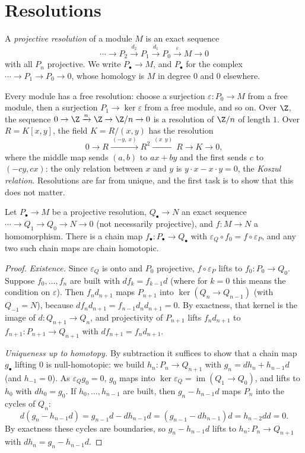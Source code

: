\section{Resolutions}

\begin{definition}\label{def:resolution}
A \emph{projective resolution} of a module $M$ is an exact sequence
\[
\cdots\to P_2\xrightarrow{d_2}P_1\xrightarrow{d_1}P_0\xrightarrow{\varepsilon}M\to0
\]
with all $P_n$ projective. We write $P_\bullet\to M$, and $P_\bullet$ for the complex $\cdots\to P_1\to P_0\to0$, whose homology is $M$ in degree $0$ and $0$ elsewhere.
\end{definition}

Every module has a free resolution: choose a surjection $\varepsilon\colon P_0\to M$ from a free module, then a surjection $P_1\to\ker\varepsilon$ from a free module, and so on. Over $\Z$, the sequence
$0\to\Z\xrightarrow{n}\Z\to\Z/n\to0$ is a resolution of $\Z/n$ of length $1$. Over $R=K[x,y]$, the field $K=R/(x,y)$ has the resolution
\[
0\to R\xrightarrow{\ (-y,\ x)\ }R^2\xrightarrow{\ (x\ \ y)\ }R\to K\to0,
\]
where the middle map sends $(a,b)$ to $ax+by$ and the first sends $c$ to $(-cy,cx)$: the only relation between $x$ and $y$ is $y\cdot x-x\cdot y=0$, the \emph{Koszul relation}. Resolutions are far from unique, and the first task is to
show that this does not matter.

\begin{theorem}\label{thm:comparison}
Let $P_\bullet\to M$ be a projective resolution, $Q_\bullet\to N$ an exact sequence $\cdots\to Q_1\to Q_0\to N\to0$ (not necessarily projective), and $f\colon M\to N$ a homomorphism. There is a chain map $f_\bullet\colon P_\bullet\to Q_\bullet$
with $\varepsilon_Q\circ f_0=f\circ\varepsilon_P$, and any two such chain maps are chain homotopic.
\end{theorem}

\begin{proof}
\emph{Existence.} Since $\varepsilon_Q$ is onto and $P_0$ projective, $f\circ\varepsilon_P$ lifts to $f_0\colon P_0\to Q_0$. Suppose $f_0,\dots,f_n$ are built with $d f_k=f_{k-1}d$ (where for $k=0$ this means the condition on
$\varepsilon$). Then $f_nd_{n+1}$ maps $P_{n+1}$ into $\ker(Q_n\to Q_{n-1})$ (with $Q_{-1}=N$), because $d f_nd_{n+1}=f_{n-1}d_nd_{n+1}=0$. By exactness, that kernel is the image of $d\colon Q_{n+1}\to Q_n$, and projectivity of
$P_{n+1}$ lifts $f_nd_{n+1}$ to $f_{n+1}\colon P_{n+1}\to Q_{n+1}$ with $df_{n+1}=f_nd_{n+1}$.

\emph{Uniqueness up to homotopy.} By subtraction it suffices to show that a chain map $g_\bullet$ lifting $0$ is null-homotopic: we build $h_n\colon P_n\to Q_{n+1}$ with $g_n=dh_n+h_{n-1}d$ (and $h_{-1}=0$). As $\varepsilon_Qg_0=0$,
$g_0$ maps into $\ker\varepsilon_Q=\operatorname{im}(Q_1\to Q_0)$, and lifts to $h_0$ with $dh_0=g_0$. If $h_0,\dots,h_{n-1}$ are built, then $g_n-h_{n-1}d$ maps $P_n$ into the cycles of $Q_n$:
\[
d(g_n-h_{n-1}d)=g_{n-1}d-dh_{n-1}d=(g_{n-1}-dh_{n-1})d=h_{n-2}dd=0.
\]
By exactness these cycles are boundaries, so $g_n-h_{n-1}d$ lifts to $h_n\colon P_n\to Q_{n+1}$ with $dh_n=g_n-h_{n-1}d$.
\end{proof}

